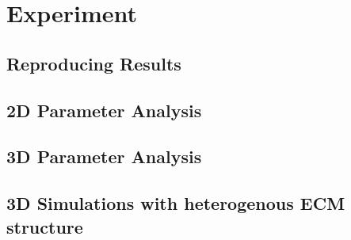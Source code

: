 \section{Experiment}
\subsection{Reproducing Results}
\subsection{2D Parameter Analysis}
\subsection{3D Parameter Analysis}
\subsection{3D Simulations with heterogenous ECM structure}